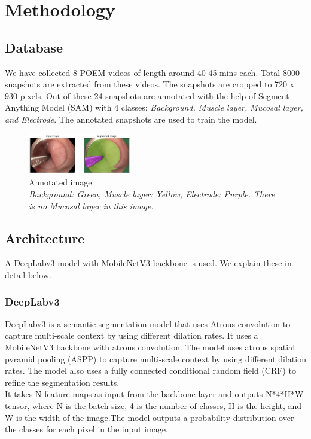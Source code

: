 \section{Methodology}
\label{sec:Methodology}

\subsection{Database}
We have collected 8 POEM videos of length around 40-45 mins each. Total 8000 snapshots are extracted from these videos. The snapshots are cropped to 720 x 930 pixels. Out of these 24 snapshots are annotated with the help of Segment Anything Model (SAM) with 4 classes: \textit{Background, Muscle layer, Mucosal layer, and Electrode}. The annotated snapshots are used to train the model.

\begin{figure}[ht]
    \centering
    \includegraphics[width=0.4\textwidth]{Images/annoted.png}
    \caption{Annotated image \\ \textit{Background: Green, Muscle layer: Yellow, Electrode: Purple. There is no Mucosal layer in this image.}}
    \label{fig:annotated}
\end{figure}

\subsection{Architecture}

A DeepLabv3 model with MobileNetV3 backbone is used. We explain these in detail below.

\subsubsection{DeepLabv3}

DeepLabv3 is a semantic segmentation model that uses Atrous convolution to capture multi-scale context by using different dilation rates. It uses a MobileNetV3 backbone with atrous convolution. The model uses atrous spatial pyramid pooling (ASPP) to capture multi-scale context by using different dilation rates. The model also uses a fully connected conditional random field (CRF) to refine the segmentation results. \\
It takes N feature maps as input from the backbone layer and outputs N*4*H*W tensor, where N is the batch size, 4 is the number of classes, H is the height, and W is the width of the image.The model outputs a probability distribution over the classes for each pixel in the input image.

